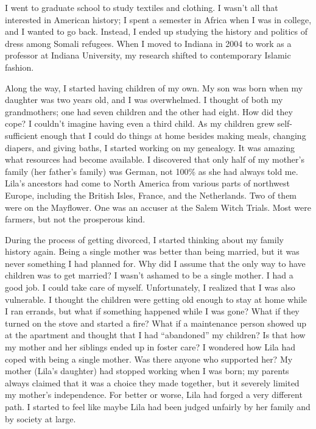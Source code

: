 \documentclass[
  letterpaper,
]{book}
\begin{document}
I went to graduate school to study textiles and clothing. I wasn't all
that interested in American history; I spent a semester in Africa when I
was in college, and I wanted to go back. Instead, I ended up studying
the history and politics of dress among Somali refugees. When I moved to
Indiana in 2004 to work as a professor at Indiana University, my
research shifted to contemporary Islamic fashion.

Along the way, I started having children of my own. My son was born when
my daughter was two years old, and I was overwhelmed. I thought of both
my grandmothers; one had seven children and the other had eight. How did
they cope? I couldn't imagine having even a third child. As my children
grew self-sufficient enough that I could do things at home besides
making meals, changing diapers, and giving baths, I started working on
my genealogy. It was amazing what resources had become available. I
discovered that only half of my mother's family (her father's family)
was German, not 100\% as she had always told me. Lila's ancestors had
come to North America from various parts of northwest Europe, including
the British Isles, France, and the Netherlands. Two of them were on the
Mayflower. One was an accuser at the Salem Witch Trials. Most were
farmers, but not the prosperous kind.

During the process of getting divorced, I started thinking about my
family history again. Being a single mother was better than being
married, but it was never something I had planned for. Why did I assume
that the only way to have children was to get married? I wasn't ashamed
to be a single mother. I had a good job. I could take care of myself.
Unfortunately, I realized that I was also vulnerable. I thought the
children were getting old enough to stay at home while I ran errands,
but what if something happened while I was gone? What if they turned on
the stove and started a fire? What if a maintenance person showed up at
the apartment and thought that I had ``abandoned'' my children? Is that
how my mother and her siblings ended up in foster care? I wondered how
Lila had coped with being a single mother. Was there anyone who
supported her? My mother (Lila's daughter) had stopped working when I
was born; my parents always claimed that it was a choice they made
together, but it severely limited my mother's independence. For better
or worse, Lila had forged a very different path. I started to feel like
maybe Lila had been judged unfairly by her family and by society at
large.
\end{document}
